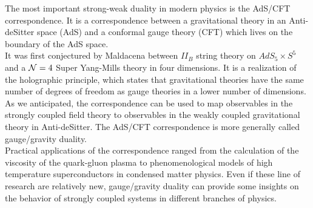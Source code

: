 The most important strong-weak duality in modern physics is the AdS/CFT correspondence. 
It is a correspondence between a gravitational theory in an Anti-deSitter space (AdS) and a conformal gauge theory (CFT) which lives on the boundary of the AdS space. \\
It was first conjectured by Maldacena between $II_B$ string theory on $AdS_5 \times S^5$ and a $\mathcal{N}=4$ Super Yang-Mills theory in four dimensions. 
It is a realization of the holographic principle, which states that gravitational theories have the same number of degrees of freedom as gauge theories in a lower number of dimensions.\\
As we anticipated, the correspondence can be used to map observables in the strongly coupled field theory to observables in the weakly coupled gravitational theory in Anti-deSitter.
The AdS/CFT correspondence is more generally called gauge/gravity duality.  \\
Practical applications of the correspondence ranged from the calculation of the viscosity of the quark-gluon plasma to phenomenological models of high temperature superconductors in condensed matter physics.
Even if these line of research are relatively new, gauge/gravity duality can provide some insights on the behavior of strongly coupled systems in different branches of physics.   
\\ 

